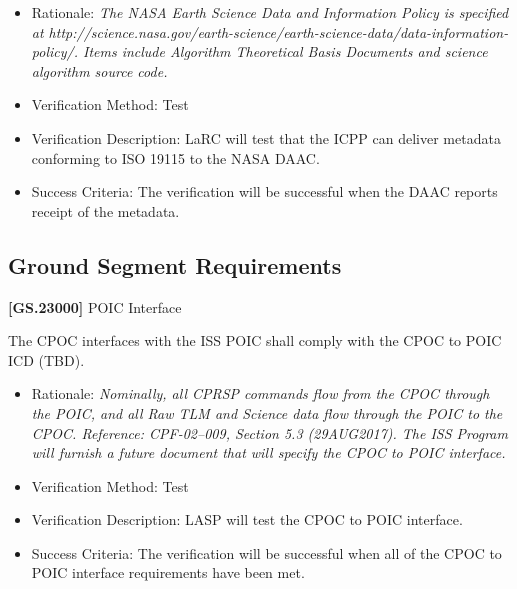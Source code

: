 \documentclass[12pt,oneside,oldfontcommands]{memoir}
\begin{document}
\begin{itemize}
\item{} Rationale: \emph{The NASA Earth Science Data and Information Policy is specified at http:\slash \slash science.nasa.gov\slash earth-science\slash earth-science-data\slash data-information-policy\slash . Items include Algorithm Theoretical Basis Documents and science algorithm source code.}

\item{} Verification Method: Test

\item{} Verification Description: \gls{LaRC} will \gls{test} that the \gls{ICPP} can deliver metadata conforming to ISO 19115 to the NASA \gls{DAAC}.

\item{} Success Criteria: The verification will be successful when the \gls{DAAC} reports receipt of the metadata.

\end{itemize}

\subsection{Ground Segment Requirements}
\label{groundsegmentrequirements}

\textbf{[GS.23000]} \gls{POIC} Interface

The \gls{CPOC} interfaces with the \gls{ISS} \gls{POIC} shall comply with the \gls{CPOC} to \gls{POIC} ICD (TBD).

\begin{itemize}
\item{} Rationale: \emph{Nominally, all CPRSP commands flow from the CPOC through the POIC, and all Raw TLM and Science data flow through the POIC to the CPOC. Reference: CPF-02--009, Section 5.3 (29AUG2017). The ISS Program will furnish a future document that will specify the CPOC to POIC interface.}

\item{} Verification Method: Test

\item{} Verification Description: \gls{LASP} will \gls{test} the \gls{CPOC} to \gls{POIC} interface.

\item{} Success Criteria: The verification will be successful when all of the \gls{CPOC} to \gls{POIC} interface requirements have been met.

\end{itemize}
\end{document}
